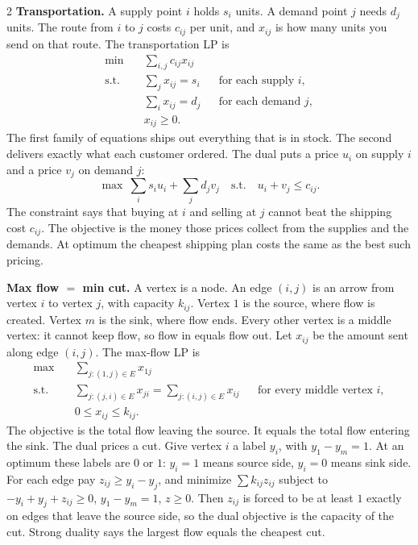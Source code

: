 \documentclass{article}
\newcommand{\kw}[1]{\textbf{#1}}
\begin{document}
\begin{multicols}{2}
\kw{Transportation.} A supply point $i$ holds $s_i$ units. A demand point $j$ needs $d_j$ units. The route from $i$ to $j$ costs $c_{ij}$ per unit, and $x_{ij}$ is how many units you send on that route. The transportation LP is
\[
\begin{aligned}
\min \quad & \sum_{i,j} c_{ij}x_{ij}\\
\text{s.t.} \quad & \sum_j x_{ij}=s_i && \text{for each supply $i$},\\
& \sum_i x_{ij}=d_j && \text{for each demand $j$},\\
& x_{ij}\ge 0.
\end{aligned}
\]
The first family of equations ships out everything that is in stock. The second delivers exactly what each customer ordered. The dual puts a price $u_i$ on supply $i$ and a price $v_j$ on demand $j$:
\[
\max\ \sum_i s_i u_i+\sum_j d_j v_j \quad\text{s.t.}\quad u_i+v_j\le c_{ij}.
\]
The constraint says that buying at $i$ and selling at $j$ cannot beat the shipping cost $c_{ij}$. The objective is the money those prices collect from the supplies and the demands. At optimum the cheapest shipping plan costs the same as the best such pricing.

\kw{Max flow $=$ min cut.} A vertex is a node. An edge $(i,j)$ is an arrow from vertex $i$ to vertex $j$, with capacity $k_{ij}$. Vertex $1$ is the source, where flow is created. Vertex $m$ is the sink, where flow ends. Every other vertex is a middle vertex: it cannot keep flow, so flow in equals flow out. Let $x_{ij}$ be the amount sent along edge $(i,j)$. The max-flow LP is
\[
\begin{aligned}
\max \quad & \sum_{j:(1,j)\in E} x_{1j}\\
\text{s.t.} \quad & \sum_{j:(j,i)\in E}x_{ji}=\sum_{j:(i,j)\in E}x_{ij} && \text{for every middle vertex $i$},\\
& 0\le x_{ij}\le k_{ij}.
\end{aligned}
\]
The objective is the total flow leaving the source. It equals the total flow entering the sink. The dual prices a cut. Give vertex $i$ a label $y_i$, with $y_1-y_m=1$. At an optimum these labels are $0$ or $1$: $y_i=1$ means source side, $y_i=0$ means sink side. For each edge pay $z_{ij}\ge y_i-y_j$, and minimize $\sum k_{ij}z_{ij}$ subject to $-y_i+y_j+z_{ij}\ge 0$, $y_1-y_m=1$, $z\ge 0$. Then $z_{ij}$ is forced to be at least $1$ exactly on edges that leave the source side, so the dual objective is the capacity of the cut. Strong duality says the largest flow equals the cheapest cut.


\end{multicols}
\end{document}
